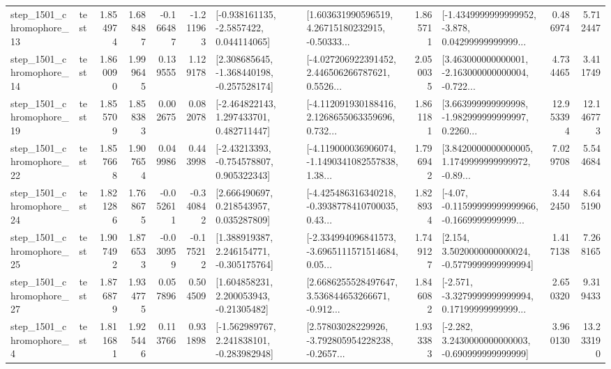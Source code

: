 \begin{tabular}{llrrrrllrlrr}
 step\_1501\_chromophore\_13 &      test &      1.854974 &    1.688487 &     -0.166487 & -1.211963 &     [-0.938161135, -2.5857422, 0.044114065] &  [1.603631990596519, 4.26715180232915, -0.50333... &       1.865711 &  [-1.4349999999999952, -3.878, 0.04299999999999... &            0.486974 &          5.712447 \\
 step\_1501\_chromophore\_14 &      test &      1.860090 &    1.999645 &      0.139555 &  1.129178 &   [2.308685645, -1.368440198, -0.257528174] &  [-4.027206922391452, 2.446506266787621, 0.5526... &       2.050035 &  [3.463000000000001, -2.163000000000004, -0.722... &            4.734465 &          3.411749 \\
 step\_1501\_chromophore\_19 &      test &      1.855709 &    1.858383 &      0.002675 &  0.082078 &    [-2.464822143, 1.297433701, 0.482711447] &  [-4.112091930188416, 2.1268655063359696, 0.732... &       1.861181 &  [3.663999999999998, -1.982999999999997, 0.2260... &           12.953394 &         12.146773 \\
 step\_1501\_chromophore\_22 &      test &      1.857668 &    1.907654 &      0.049986 &  0.443998 &    [-2.43213393, -0.754578807, 0.905322343] &  [-4.119000036906074, -1.1490341082557838, 1.38... &       1.796942 &  [3.8420000000000005, 1.1749999999999972, -0.89... &            7.029708 &          5.544684 \\
 step\_1501\_chromophore\_24 &      test &      1.821286 &    1.768675 &     -0.052611 & -0.340842 &     [2.666490697, 0.218543957, 0.035287809] &  [-4.425486316340218, -0.3938778410700035, 0.43... &       1.828934 &  [-4.07, -0.11599999999999966, -0.1669999999999... &            3.442450 &          8.645190 \\
 step\_1501\_chromophore\_25 &      test &      1.907492 &    1.876533 &     -0.030959 & -0.175212 &    [1.388919387, 2.246154771, -0.305175764] &  [-2.334994096841573, -3.6965111571514684, 0.05... &       1.749127 &   [2.154, 3.5020000000000024, -0.5779999999999994] &            1.417138 &          7.268165 \\
 step\_1501\_chromophore\_27 &      test &      1.876879 &    1.934775 &      0.057896 &  0.504509 &     [1.604858231, 2.200053943, -0.21305482] &  [2.6686255528497647, 3.536844653266671, -0.912... &       1.846082 &  [-2.571, -3.3279999999999994, 0.17199999999999... &            2.650320 &          9.319433 \\
  step\_1501\_chromophore\_4 &      test &      1.811681 &    1.925446 &      0.113766 &  0.931898 &   [-1.562989767, 2.241838101, -0.283982948] &  [2.57803028229926, -3.792805954228238, -0.2657... &       1.933383 &   [-2.282, 3.2430000000000003, -0.690999999999999] &            3.960130 &         13.233190 \\

\end{tabular}
